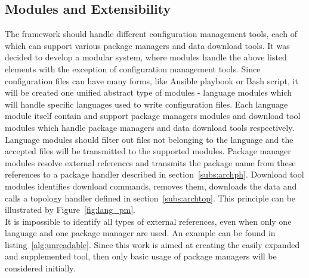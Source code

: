 \subsection{Modules and Extensibility}
The framework should handle different configuration management tools, each of which can support various package managers and data download tools.
It was decided to develop a modular system, where modules handle the above listed elements with the exception of configuration management tools.
Since configuration files can have many forms, like Ansible playbook or Bash script, it will be created one unified abstract type of modules - language modules which will handle specific languages used to write configuration files.
Each language module itself contain and support package managers modules and download tool modules which handle package managers and data download tools respectively.
Language modules should filter out files not belonging to the language and the accepted files will be transmitted to the supported modules.
Package manager modules resolve external references and transmits the package name from these references to a package handler described in section~\ref{subs:archph}.
Download tool modules identifies download commands, removes them, downloads the data and calls a topology handler defined in section~\ref{subs:archtop}. 
This principle can be illustrated by Figure~\ref{fig:lang_pm}.
\\
It is impossible to identify all types of external references, even when only one language and one package manager are used.
An example can be found in listing~\ref{alg:unreadable}.
Since this work is aimed at creating the easily expanded and supplemented tool, then only basic usage of package managers will be considered initially.\\
